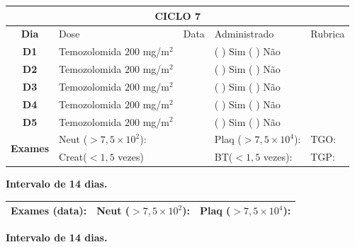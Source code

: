 \documentclass[11pt,a4paper,oldfontcommands]{memoir}
\begin{document}
\begin{center}
\begin{longtable}{p{1cm}p{4cm}|p{1cm}|p{4.6cm}|p{3cm}}
	\hline
	\multicolumn{5}{c}{\textbf{CICLO 7}}\\
\hline
    \multicolumn{1}{c|}{\multirow{1}{*}{\textbf{Dia}}}&{Dose}&{Data}&{Administrado}&{Rubrica} \\
    \hline
    \multicolumn{1}{c|}{\multirow{1}{*}{\textbf{D1}}}&{Temozolomida \(200\) mg/m\(^2\)}&&{(  ) Sim (  ) Não}&\\
    \multicolumn{1}{c|}{\multirow{1}{*}{\textbf{D2}}}&{Temozolomida \(200\) mg/m\(^2\)}&&{(  ) Sim (  ) Não}&\\
    \multicolumn{1}{c|}{\multirow{1}{*}{\textbf{D3}}}&{Temozolomida \(200\) mg/m\(^2\)}&&{(  ) Sim (  ) Não}&\\
    \multicolumn{1}{c|}{\multirow{1}{*}{\textbf{D4}}}&{Temozolomida \(200\) mg/m\(^2\)}&&{(  ) Sim (  ) Não}&\\
    \multicolumn{1}{c|}{\multirow{1}{*}{\textbf{D5}}}&{Temozolomida \(200\) mg/m\(^2\)}&&{(  ) Sim (  ) Não}&\\
    \hline
    \multicolumn{1}{c|}{\multirow{2}{*}{\textbf{Exames}}}&\multicolumn{2}{l|}{Neut (\(>7,5\times10^2\)):}&{Plaq (\(>7,5\times10^4\)):}&{TGO:}\\
    \cline{2-5}
    \multicolumn{1}{c|}{\multirow{2}{*}{{}}}&\multicolumn{2}{l|}{Creat(\(<1,5\) vezes)}&{BT(\(<1,5\) vezes):}&{TGP:}
    \\
    \hline
\end{longtable}
\textbf{Intervalo de 14 dias.}
\begin{longtable}{p{5cm}|p{5cm}|p{4.5cm}}
    \hline
    \textbf{Exames (data):}&{Neut (\(>7,5\times10^2\)):}&{Plaq (\(>7,5\times10^4\)):}
    \\
    \hline
\end{longtable}
\textbf{Intervalo de 14 dias.}
\end{center}
\clearpage
\end{document}
